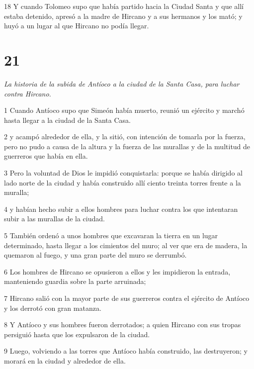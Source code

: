 \par 18 Y cuando Tolomeo supo que había partido hacia la Ciudad Santa y que allí estaba detenido, apresó a la madre de Hircano y a sus hermanos y los mató; y huyó a un lugar al que Hircano no podía llegar.



\chapter{21}

\par \textit{La historia de la subida de Antíoco a la ciudad de la Santa Casa, para luchar contra Hircano.}

\par 1 Cuando Antíoco supo que Simeón había muerto, reunió un ejército y marchó hasta llegar a la ciudad de la Santa Casa.

\par 2 y acampó alrededor de ella, y la sitió, con intención de tomarla por la fuerza, pero no pudo a causa de la altura y la fuerza de las murallas y de la multitud de guerreros que había en ella.

\par 3 Pero la voluntad de Dios le impidió conquistarla: porque se había dirigido al lado norte de la ciudad y había construido allí ciento treinta torres frente a la muralla;

\par 4 y habían hecho subir a ellos hombres para luchar contra los que intentaran subir a las murallas de la ciudad.

\par 5 También ordenó a unos hombres que excavaran la tierra en un lugar determinado, hasta llegar a los cimientos del muro; al ver que era de madera, la quemaron al fuego, y una gran parte del muro se derrumbó.

\par 6 Los hombres de Hircano se opusieron a ellos y les impidieron la entrada, manteniendo guardia sobre la parte arruinada;

\par 7 Hircano salió con la mayor parte de sus guerreros contra el ejército de Antíoco y los derrotó con gran matanza.

\par 8 Y Antíoco y sus hombres fueron derrotados; a quien Hircano con sus tropas persiguió hasta que los expulsaron de la ciudad.

\par 9 Luego, volviendo a las torres que Antíoco había construido, las destruyeron; y morará en la ciudad y alrededor de ella.

